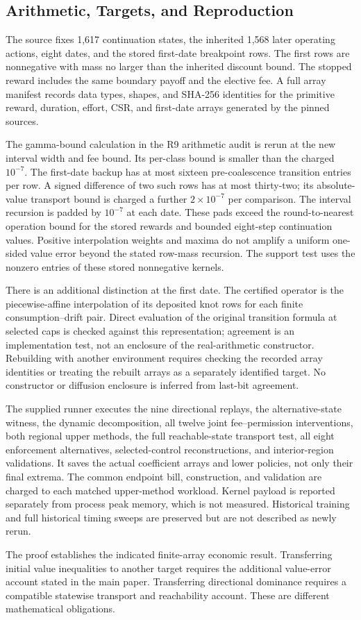 \subsection{Arithmetic, Targets, and Reproduction}
The source fixes 1,617 continuation states, the inherited 1,568 later operating actions, eight dates, and the stored first-date breakpoint rows. The first rows are nonnegative with mass no larger than the inherited discount bound. The stopped reward includes the same boundary payoff and the elective fee. A full array manifest records data types, shapes, and SHA-256 identities for the primitive reward, duration, effort, CSR, and first-date arrays generated by the pinned sources.

The gamma-bound calculation in the R9 arithmetic audit is rerun at the new interval width and fee bound. Its per-class bound is smaller than the charged $10^{-7}$. The first-date backup has at most sixteen pre-coalescence transition entries per row. A signed difference of two such rows has at most thirty-two; its absolute-value transport bound is charged a further $2\times10^{-7}$ per comparison. The interval recursion is padded by $10^{-7}$ at each date. These pads exceed the round-to-nearest operation bound for the stored rewards and bounded eight-step continuation values. Positive interpolation weights and maxima do not amplify a uniform one-sided value error beyond the stated row-mass recursion. The support test uses the nonzero entries of these stored nonnegative kernels.

There is an additional distinction at the first date. The certified operator is the piecewise-affine interpolation of its deposited knot rows for each finite consumption--drift pair. Direct evaluation of the original transition formula at selected caps is checked against this representation; agreement is an implementation test, not an enclosure of the real-arithmetic constructor. Rebuilding with another environment requires checking the recorded array identities or treating the rebuilt arrays as a separately identified target. No constructor or diffusion enclosure is inferred from last-bit agreement.

The supplied runner executes the nine directional replays, the alternative-state witness, the dynamic decomposition, all twelve joint fee--permission interventions, both regional upper methods, the full reachable-state transport test, all eight enforcement alternatives, selected-control reconstructions, and interior-region validations. It saves the actual coefficient arrays and lower policies, not only their final extrema. The common endpoint bill, construction, and validation are charged to each matched upper-method workload. Kernel payload is reported separately from process peak memory, which is not measured. Historical training and full historical timing sweeps are preserved but are not described as newly rerun.

The proof establishes the indicated finite-array economic result. Transferring initial value inequalities to another target requires the additional value-error account stated in the main paper. Transferring directional dominance requires a compatible statewise transport and reachability account. These are different mathematical obligations.
